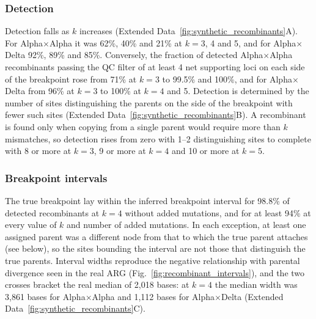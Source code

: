 \documentclass[12pt]{article}
\newcommand{\figref}[1]{Fig.~\ref{#1}}
\newcommand{\edref}[1]{Extended Data~\ref{#1}}
\begin{document}
\subsubsection{Detection}
Detection falls as $k$ increases (\edref{fig:synthetic_recombinants}A).
For Alpha$\times$Alpha it was 62\%, 40\% and 21\% at $k=3$, 4 and 5,
and for Alpha$\times$Delta 92\%, 89\% and 85\%.
Conversely, the fraction of detected Alpha$\times$Alpha recombinants
passing the QC filter of at least 4 net supporting loci on each side
of the breakpoint rose from 71\% at $k=3$ to 99.5\% and 100\%,
and for Alpha$\times$Delta from 96\% at $k=3$ to 100\% at $k=4$ and 5.
Detection is determined by the number of sites distinguishing
the parents on the side of the breakpoint with fewer such sites
(\edref{fig:synthetic_recombinants}B).
A recombinant is found only when copying from a single parent
would require more than $k$ mismatches, so detection
rises from zero with 1--2 distinguishing sites to complete
with 8 or more at $k=3$, 9 or more at $k=4$
and 10 or more at $k=5$.

\subsubsection{Breakpoint intervals}
The true breakpoint lay within the inferred breakpoint interval
for 98.8\% of detected recombinants at $k=4$ without added mutations,
and for at least 94\% at every value of $k$ and number of added mutations.
In each exception, at least one assigned parent was a different node
from that to which the true parent attaches (see below),
so the sites bounding the interval are not those that distinguish the true parents.
Interval widths reproduce the negative relationship with parental divergence
seen in the real ARG (\figref{fig:recombinant_intervals}),
and the two crosses bracket the real median of 2,018 bases:
at $k=4$ the median width was 3,861 bases for Alpha$\times$Alpha
and 1,112 bases for Alpha$\times$Delta
(\edref{fig:synthetic_recombinants}C).
\end{document}
